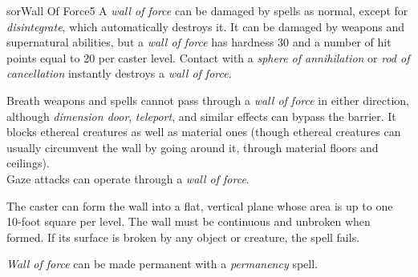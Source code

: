 \begin{spellcard}{sor}{Wall Of Force}{5}
  A \emph{wall of force} can be damaged by spells as normal, except for
  \emph{disintegrate}, which automatically destroys it. It can be damaged
  by weapons and supernatural abilities, but a \emph{wall of force} has
  hardness 30 and a number of hit points equal to 20 per caster level.
  Contact with a \emph{sphere of annihilation} or \emph{rod of
    cancellation} instantly destroys a \emph{wall of force}.

  Breath weapons and spells cannot pass through a \emph{wall of force} in
  either direction, although \emph{dimension door}, \emph{teleport}, and
  si\-mi\-lar effects can bypass the barrier. It blocks ethereal creatures as
  well as material ones (though ethereal creatures can usually circumvent
  the wall by going around it, through material floors and ceilings).\\
  Gaze attacks can operate through a \emph{wall of force}.

  The caster can form the wall into a flat, vertical plane whose area is
  up to one 10-foot square per level. The wall must be continuous and
  unbroken when formed. If its surface is broken by any object or
  creature, the spell fails.

  \emph{Wall of force} can be made permanent with a \emph{permanency}
  spell.

\end{spellcard}
